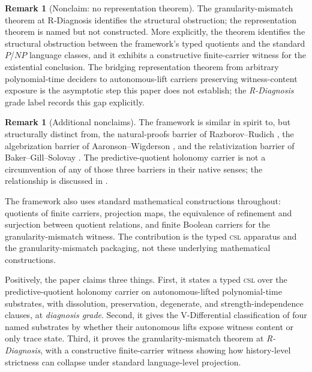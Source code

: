 \documentclass[11pt]{article}
\newcommand{\CSL}{\textsc{csl}}            \newcommand{\CSLcore}{Candidate Structural Law}
\newcommand{\DiagnosisGrade}{\emph{diagnosis grade}}
\newcommand{\RDiagnosis}{\emph{R-Diagnosis}}
\theoremstyle{definition}
\newtheorem{remark}[theorem]{Remark}
\begin{document}
\begin{remark}[Nonclaim: no representation theorem]
The granularity-mismatch theorem at R-Diagnosis identifies the
structural obstruction; the representation theorem is named but not
constructed.  More explicitly, the theorem identifies the structural
obstruction between the framework's typed quotients and the standard
\(P\)/\(NP\) language classes, and it exhibits a constructive
finite-carrier witness for the existential conclusion.  The bridging
representation theorem from arbitrary polynomial-time deciders to
autonomous-lift carriers preserving witness-content exposure is the
asymptotic step this paper does not establish; the \RDiagnosis{} grade
label records this gap explicitly.
\end{remark}

\begin{remark}[Additional nonclaims]
The framework is similar in spirit to, but structurally distinct from,
the natural-proofs barrier of Razborov--Rudich
\citep{RazborovRudich1997NaturalProofs}, the algebrization barrier of
Aaronson--Wigderson \citep{AaronsonWigderson2009Algebrization}, and the
relativization barrier of Baker--Gill--Solovay
\citep{BakerGillSolovay1975Relativization}.  The predictive-quotient
holonomy carrier is not a circumvention of any of those three barriers
in their native senses; the relationship is discussed in
.

The framework also uses standard mathematical constructions throughout:
quotients of finite carriers, projection maps, the equivalence of
refinement and surjection between quotient relations, and finite
Boolean carriers for the granularity-mismatch witness.  The
contribution is the typed \CSL{} apparatus and the
granularity-mismatch packaging, not these underlying mathematical
constructions.
\end{remark}

Positively, the paper claims three things.  First, it states a typed
\CSL{} over the predictive-quotient holonomy carrier on
autonomous-lifted polynomial-time substrates, with dissolution,
preservation, degenerate, and strength-independence clauses, at
\DiagnosisGrade{}.  Second, it gives the V-Differential classification
of four named substrates by whether their autonomous lifts expose
witness content or only trace state.  Third, it proves the
granularity-mismatch theorem at \RDiagnosis{}, with a constructive
finite-carrier witness showing how history-level strictness can
collapse under standard language-level projection.
\end{document}
